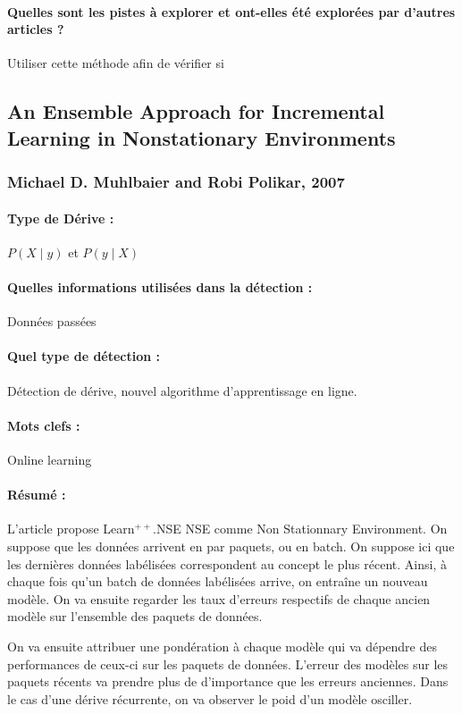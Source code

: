 \documentclass[11pt,a4paper]{report}
\begin{document}
\paragraph{Quelles sont les pistes à explorer et ont-elles  été explorées par d'autres articles ?} Utiliser cette méthode afin de vérifier si 



\subsection{An Ensemble Approach for Incremental Learning in Nonstationary Environments}
\subsubsection{Michael D. Muhlbaier and Robi Polikar, 2007}

\paragraph{Type de Dérive :} $P(X\mid y)$ et $P(y \mid X)$
\paragraph{Quelles informations utilisées dans la détection :} Données passées
\paragraph{Quel type de détection :} Détection de dérive, nouvel algorithme d'apprentissage en ligne.

\paragraph{Mots clefs :} Online learning

\paragraph{Résumé :} L'article propose Learn$^{++}$.NSE NSE comme Non Stationnary Environment. On suppose que les données arrivent en par paquets, ou en batch. On suppose ici que les dernières données labélisées correspondent au concept le plus récent. Ainsi, à chaque fois qu'un batch de données labélisées arrive, on entraîne un nouveau modèle. On va ensuite regarder les taux d'erreurs respectifs de chaque ancien modèle sur l'ensemble des paquets de données. 

On va ensuite attribuer une pondération à chaque modèle qui va dépendre des performances de ceux-ci sur les paquets de données. L'erreur des modèles sur les paquets récents va prendre plus de d'importance que les erreurs anciennes. Dans le cas d'une dérive récurrente, on va observer le poid d'un modèle osciller.
\end{document}

